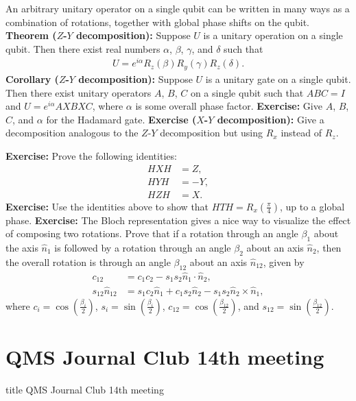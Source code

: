 \documentclass{beamer}
\begin{document}
\begin{frame}
\justify
An arbitrary unitary operator on a single qubit can be written in many ways as a combination of rotations, together with global phase shifts on the qubit.
\vfill
\textbf{Theorem ($Z$-$Y$ decomposition):} Suppose $U$ is a unitary operation on a single qubit. Then there exist real numbers $\alpha$, $\beta$, $\gamma$, and $\delta$ such that
\begin{align}
U = e^{i \alpha} R_z(\beta) R_y(\gamma) R_z(\delta).
\end{align}
\vfill
\textbf{Corollary ($Z$-$Y$ decomposition):} Suppose $U$ is a unitary gate on a single qubit. Then there exist unitary operators $A$, $B$, $C$ on a single qubit such that $ABC = I$ and $U = e^{i \alpha} AXBXC$, where $\alpha$ is some overall phase factor.
\vfill
\textbf{Exercise:} Give $A$, $B$, $C$, and $\alpha$ for the Hadamard gate.
\vfill
\textbf{\textcolor[rgb]{1,0,0}{Exercise ($X$-$Y$ decomposition):}} Give a decomposition analogous to the $Z$-$Y$ decomposition but using $R_x$ instead of $R_z$.
\end{frame}

\begin{frame}
\justify
\textbf{Exercise:} Prove the following identities:
\begin{align}
HXH & = Z, \\
HYH & = -Y, \\
HZH & = X.
\end{align}
\vfill
\textbf{Exercise:} Use the identities above to show that $HTH = R_x (\frac{\pi}{4})$, up to a global phase.
\vfill
\textbf{\textcolor[rgb]{1,0,0}{Exercise:}} The Bloch representation gives a nice way to visualize the effect of composing two rotations. Prove that if a rotation through an angle $\beta_1$ about the axis $\hat{n}_1$ is followed by a rotation through an angle $\beta_2$ about an axis $\hat{n}_2$, then the overall rotation is through an angle $\beta_{12}$ about an axis $\hat{n}_{12}$, given by
\begin{align}
c_{12} & = c_1 c_2 - s_1 s_2 \hat{n}_1 \cdot \hat{n}_2, \\
s_{12} \hat{n}_{12} & = s_1 c_2 \hat{n}_1 + c_1 s_2 \hat{n}_2 - s_1 s_2 \hat{n}_2 \times \hat{n}_1,
\end{align}
where $c_i = \cos (\frac{\beta_i}{2})$, $s_i = \sin (\frac{\beta_i}{2})$, $c_{12} = \cos (\frac{\beta_{12}}{2})$, and $s_{12} = \sin (\frac{\beta_{12}}{2})$.
\end{frame}

\section{QMS Journal Club 14th meeting}
\begin{frame}
\vfill
\centering
\begin{beamercolorbox}[sep=8pt,center,shadow=true,rounded=true]{title}
\Large QMS Journal Club 14th meeting
\end{beamercolorbox}
\vfill
\end{frame}
\end{document}
